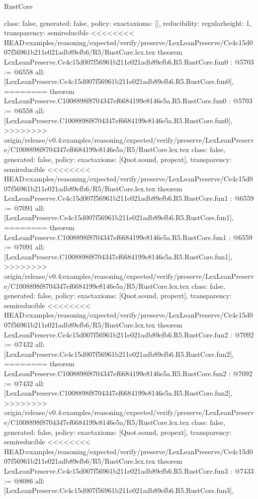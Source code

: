 \begin{lexlean}{RustCore}
\begin{coremodule}
{\begin{coremodule}
{{{  class: false,
  generated: false,
  policy: exact{axioms: []},
  reducibility: regular{height: 1},
  transparency: semireducible
}
<<<<<<<< HEAD:examples/reasoning/expected/verify/preserve/LexLeanPreserve/Ce4c15d007f56961b211e021adb89efb6/R5/RustCore.lex.tex
theorem LexLeanPreserve.Ce4c15d007f56961b211e021adb89efb6.R5.RustCore.fun0 : @5703 := @6558 {
  all: [LexLeanPreserve.Ce4c15d007f56961b211e021adb89efb6.R5.RustCore.fun0],
========
theorem LexLeanPreserve.C1008898f8704347ef6684199e8146e5a.R5.RustCore.fun0 : @5703 := @6558 {
  all: [LexLeanPreserve.C1008898f8704347ef6684199e8146e5a.R5.RustCore.fun0],
>>>>>>>> origin/release/v0.4:examples/reasoning/expected/verify/preserve/LexLeanPreserve/C1008898f8704347ef6684199e8146e5a/R5/RustCore.lex.tex
  class: false,
  generated: false,
  policy: exact{axioms: [Quot.sound, propext]},
  transparency: semireducible
}
<<<<<<<< HEAD:examples/reasoning/expected/verify/preserve/LexLeanPreserve/Ce4c15d007f56961b211e021adb89efb6/R5/RustCore.lex.tex
theorem LexLeanPreserve.Ce4c15d007f56961b211e021adb89efb6.R5.RustCore.fun1 : @6559 := @7091 {
  all: [LexLeanPreserve.Ce4c15d007f56961b211e021adb89efb6.R5.RustCore.fun1],
========
theorem LexLeanPreserve.C1008898f8704347ef6684199e8146e5a.R5.RustCore.fun1 : @6559 := @7091 {
  all: [LexLeanPreserve.C1008898f8704347ef6684199e8146e5a.R5.RustCore.fun1],
>>>>>>>> origin/release/v0.4:examples/reasoning/expected/verify/preserve/LexLeanPreserve/C1008898f8704347ef6684199e8146e5a/R5/RustCore.lex.tex
  class: false,
  generated: false,
  policy: exact{axioms: [Quot.sound, propext]},
  transparency: semireducible
}
<<<<<<<< HEAD:examples/reasoning/expected/verify/preserve/LexLeanPreserve/Ce4c15d007f56961b211e021adb89efb6/R5/RustCore.lex.tex
theorem LexLeanPreserve.Ce4c15d007f56961b211e021adb89efb6.R5.RustCore.fun2 : @7092 := @7432 {
  all: [LexLeanPreserve.Ce4c15d007f56961b211e021adb89efb6.R5.RustCore.fun2],
========
theorem LexLeanPreserve.C1008898f8704347ef6684199e8146e5a.R5.RustCore.fun2 : @7092 := @7432 {
  all: [LexLeanPreserve.C1008898f8704347ef6684199e8146e5a.R5.RustCore.fun2],
>>>>>>>> origin/release/v0.4:examples/reasoning/expected/verify/preserve/LexLeanPreserve/C1008898f8704347ef6684199e8146e5a/R5/RustCore.lex.tex
  class: false,
  generated: false,
  policy: exact{axioms: [Quot.sound, propext]},
  transparency: semireducible
}
<<<<<<<< HEAD:examples/reasoning/expected/verify/preserve/LexLeanPreserve/Ce4c15d007f56961b211e021adb89efb6/R5/RustCore.lex.tex
theorem LexLeanPreserve.Ce4c15d007f56961b211e021adb89efb6.R5.RustCore.fun3 : @7433 := @8086 {
  all: [LexLeanPreserve.Ce4c15d007f56961b211e021adb89efb6.R5.RustCore.fun3],
}}}}}}
\end{coremodule}}
\end{coremodule}
\end{lexlean}
